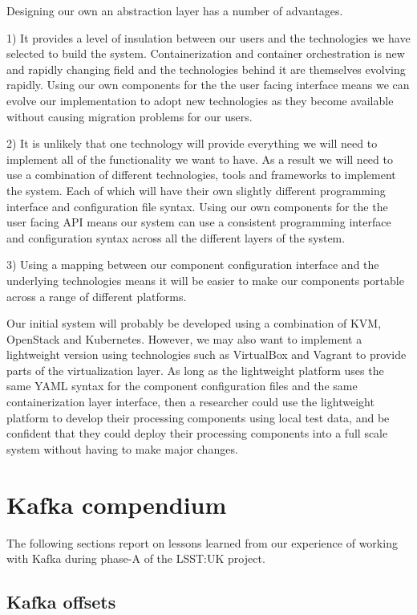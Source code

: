 \documentclass{article}
\newcommand{\yaml} {YAML\xspace}
\newcommand{\openstack} {OpenStack\xspace}
\newcommand{\kafka} {Kafka\xspace}
\newcommand{\kubernetes} {Kubernetes\xspace}
\newcommand{\virtualbox} {VirtualBox\xspace}
\newcommand{\vagrant} {Vagrant\xspace}
\newcommand{\kvm} {KVM\xspace}
\newcommand{\phasea} {phase-A\xspace}
\newcommand{\lsstuk} {LSST:UK\xspace}
\begin{document}
Designing our own an abstraction layer has a number of advantages.

1) It provides a level of insulation between our users and the technologies we have selected to build the system. Containerization and container orchestration is new and rapidly changing field and the technologies behind it are themselves evolving rapidly.
Using our own components for the the user facing interface means we can evolve our implementation to adopt new technologies as they become available without causing migration problems for our users.

2) It is unlikely that one technology will provide everything we will need to implement all of the functionality we want to have. As a result we will need to use a combination of different technologies, tools and frameworks to implement the system. Each of which will have their own slightly different programming interface and configuration file syntax.
Using our own components for the the user facing API means our system can use a consistent programming interface and configuration syntax across all the different layers of the system.

3) Using a mapping between our component configuration interface and the underlying technologies means it will be easier to make our components portable across a range of different platforms.

Our initial system will probably be developed using a combination of \kvm, \openstack and \kubernetes. However, we may also want to implement a lightweight version using technologies such as \virtualbox and \vagrant to provide parts of the virtualization layer.
As long as the lightweight platform uses the same \yaml syntax for the component configuration files and the same containerization layer interface, then a researcher could use the lightweight platform to develop their processing components using local test data, and be confident that they could deploy their processing components into a full scale system without having to make major changes.

\section{Kafka compendium}
\label{kafka-compendium}

The following sections report on lessons learned from our experience of working with \kafka during \phasea of the \lsstuk project.

\subsection{Kafka offsets}
\label{kafka-offsets}
\end{document}
